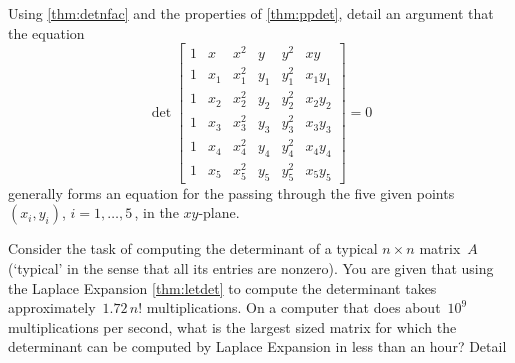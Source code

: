 \begin{exercise}  
Using \cref{thm:detnfac} and the properties of \cref{thm:ppdet}, detail an argument that the equation
\begin{equation*}
\det\begin{bmatrix} 1&x&x^2&y&y^2&xy
\\1&x_1&x_1^2&y_1&y_1^2&x_1y_1
\\1&x_2&x_2^2&y_2&y_2^2&x_2y_2
\\1&x_3&x_3^2&y_3&y_3^2&x_3y_3 
\\1&x_4&x_4^2&y_4&y_4^2&x_4y_4 
\\1&x_5&x_5^2&y_5&y_5^2&x_5y_5 
\end{bmatrix}=0
\end{equation*}
generally forms an equation for the  passing through the five given points \((x_i,y_i)\), \(i=1,\ldots,5\)\,, in the \(xy\)-plane.
\end{exercise}




\begin{exercise}  
Consider the task of computing the determinant of a typical \(n\times n\) matrix~\(A\) (`typical' in the sense that all its entries are nonzero).  
You are given that using the Laplace Expansion \cref{thm:letdet} to compute the determinant takes approximately~\(1.72\,n!\) multiplications.
On a computer that does about~\(10^9\) multiplications per second, what is the largest sized matrix for which the determinant can be computed by Laplace Expansion in less than an hour?
Detail 
\end{exercise}







